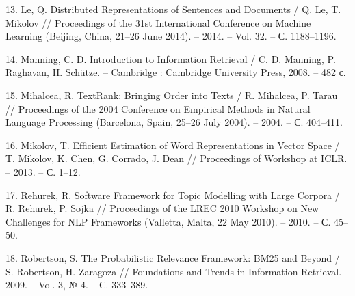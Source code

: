 13. Le, Q. Distributed Representations of Sentences and Documents / Q. Le, T. Mikolov // Proceedings of the 31st International Conference on Machine Learning (Beijing, China, 21–26 June 2014). – 2014. – Vol. 32. – С. 1188–1196.

14. Manning, C. D. Introduction to Information Retrieval / C. D. Manning, P. Raghavan, H. Schütze. – Cambridge : Cambridge University Press, 2008. – 482 с.

15. Mihalcea, R. TextRank: Bringing Order into Texts / R. Mihalcea, P. Tarau // Proceedings of the 2004 Conference on Empirical Methods in Natural Language Processing (Barcelona, Spain, 25–26 July 2004). – 2004. – С. 404–411.

16. Mikolov, T. Efficient Estimation of Word Representations in Vector Space / T. Mikolov, K. Chen, G. Corrado, J. Dean // Proceedings of Workshop at ICLR. – 2013. – С. 1–12.

17. Rehurek, R. Software Framework for Topic Modelling with Large Corpora / R. Rehurek, P. Sojka // Proceedings of the LREC 2010 Workshop on New Challenges for NLP Frameworks (Valletta, Malta, 22 May 2010). – 2010. – С. 45–50.

18. Robertson, S. The Probabilistic Relevance Framework: BM25 and Beyond / S. Robertson, H. Zaragoza // Foundations and Trends in Information Retrieval. – 2009. – Vol. 3, № 4. – С. 333–389.

\clearpage